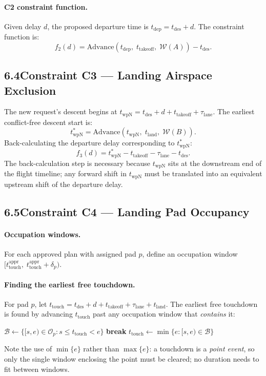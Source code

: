 \documentclass[12pt,a4paper]{article}
\newcommand{\tdep}{t_{\mathrm{dep}}}
\newcommand{\twpN}{t_{\mathrm{wpN}}}
\newcommand{\ttouch}{t_{\mathrm{touch}}}
\newcommand{\tto}{t_{\mathrm{takeoff}}}
\newcommand{\tland}{t_{\mathrm{land}}}
\newcommand{\lane}{\tau_{\mathrm{lane}}}
\begin{document}
\paragraph{C2 constraint function.}
Given delay $d$, the proposed departure time is $\tdep = t_{\mathrm{des}} + d$.
The constraint function is:
\begin{equation}
  f_2(d) = \mathrm{Advance}(\tdep,\;\tto,\;\mathcal{W}(A)) - t_{\mathrm{des}}.
  \label{eq:c2}
\end{equation}

\bigskip
\subsection*{6.4\quad Constraint C3 — Landing Airspace Exclusion}

The new request's descent begins at $\twpN = t_{\mathrm{des}} + d + \tto + \lane$.
The earliest conflict-free descent start is:
\[
  \twpN^* = \mathrm{Advance}(\twpN,\;\tland,\;\mathcal{W}(B)).
\]
Back-calculating the departure delay corresponding to $\twpN^*$:
\begin{equation}
  f_3(d) = \twpN^* - \tto - \lane - t_{\mathrm{des}}.
  \label{eq:c3}
\end{equation}
The back-calculation step is necessary because $\twpN$ sits at the downstream
end of the flight timeline; any forward shift in $\twpN$ must be translated
into an equivalent upstream shift of the departure delay.

\bigskip
\subsection*{6.5\quad Constraint C4 — Landing Pad Occupancy}

\paragraph{Occupation windows.}
For each approved plan with assigned pad $p$, define an occupation window
$[\ttouch^{\mathrm{appr}},\;\ttouch^{\mathrm{appr}} + \delta_p)$.

\paragraph{Finding the earliest free touchdown.}
For pad $p$, let $\ttouch = t_{\mathrm{des}} + d + \tto + \lane + \tland$.
The earliest free touchdown is found by advancing $\ttouch$ past any
occupation window that \emph{contains} it:
\begin{algorithm}[H]
\caption{Earliest free touchdown on pad $p$}
\begin{algorithmic}[1]
  \State $\mathcal{B} \gets \{[s,e)\in\mathcal{O}_p : s \le \ttouch < e\}$
   \textbf{break} \EndIf
  \State $\ttouch \gets \min\{e : [s,e) \in \mathcal{B}\}$
\EndFor
\end{algorithmic}
\end{algorithm}
\noindent
Note the use of $\min\{e\}$ rather than $\max\{e\}$: a touchdown is a
\emph{point event}, so only the single window enclosing the point must be
cleared; no duration needs to fit between windows.
\end{document}
